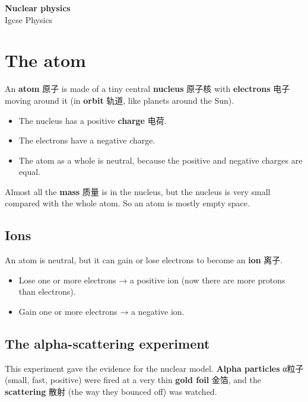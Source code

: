 \documentclass[11pt]{article}
\begin{document}
\begin{center}
  {\LARGE\bfseries Nuclear physics}\\[0.35em]
  {\large Igcse Physics}
\end{center}
\vspace{0.6em}

\section*{The atom}

An \textbf{atom} 原子 is made of a tiny central \textbf{nucleus} 原子核 with \textbf{electrons} 电子 moving around it (in \textbf{orbit} 轨道, like planets around the Sun).

\begin{itemize}
\item The nucleus has a positive \textbf{charge} 电荷.

\item The electrons have a negative charge.

\item The atom as a whole is neutral, because the positive and negative charges are equal.

\end{itemize}

Almost all the \textbf{mass} 质量 is in the nucleus, but the nucleus is very small compared with the whole atom. So an atom is mostly empty space.

\subsection*{Ions}

An atom is neutral, but it can gain or lose electrons to become an \textbf{ion} 离子.

\begin{itemize}
\item Lose one or more electrons → a positive ion (now there are more protons than electrons).

\item Gain one or more electrons → a negative ion.

\end{itemize}

\subsection*{The alpha-scattering experiment}

This experiment gave the evidence for the nuclear model. \textbf{Alpha particles} α粒子 (small, fast, positive) were fired at a very thin \textbf{gold foil} 金箔, and the \textbf{scattering} 散射 (the way they bounced off) was watched.
\end{document}
